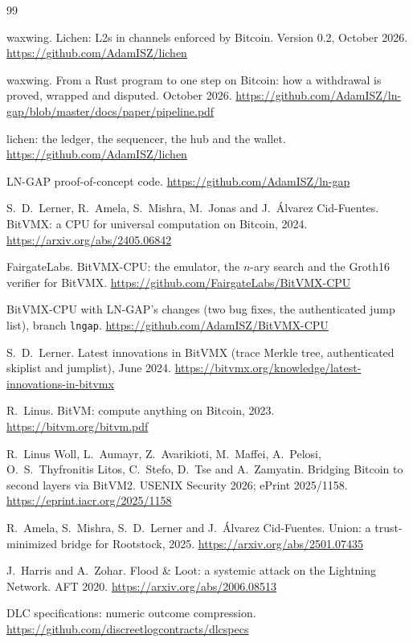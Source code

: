 \documentclass[11pt]{article}
\begin{document}
\begin{thebibliography}{99}

 waxwing. Lichen: L2s in channels enforced by Bitcoin. Version 0.2, October 2026. \url{https://github.com/AdamISZ/lichen}

 waxwing. From a Rust program to one step on Bitcoin: how a withdrawal is proved, wrapped and disputed. October 2026. \url{https://github.com/AdamISZ/ln-gap/blob/master/docs/paper/pipeline.pdf}

 lichen: the ledger, the sequencer, the hub and the wallet. \url{https://github.com/AdamISZ/lichen}

 LN-GAP proof-of-concept code. \url{https://github.com/AdamISZ/ln-gap}

 S.~D.~Lerner, R.~Amela, S.~Mishra, M.~Jonas and J.~\'Alvarez Cid-Fuentes. BitVMX: a CPU for universal computation on Bitcoin, 2024. \url{https://arxiv.org/abs/2405.06842}

 FairgateLabs. BitVMX-CPU: the emulator, the $n$-ary search and the Groth16 verifier for BitVMX. \url{https://github.com/FairgateLabs/BitVMX-CPU}

 BitVMX-CPU with LN-GAP's changes (two bug fixes, the authenticated jump list), branch \texttt{lngap}. \url{https://github.com/AdamISZ/BitVMX-CPU}

 S.~D.~Lerner. Latest innovations in BitVMX (trace Merkle tree, authenticated skiplist and jumplist), June 2024. \url{https://bitvmx.org/knowledge/latest-innovations-in-bitvmx}

 R.~Linus. BitVM: compute anything on Bitcoin, 2023. \url{https://bitvm.org/bitvm.pdf}

 R.~Linus Woll, L.~Aumayr, Z.~Avarikioti, M.~Maffei, A.~Pelosi, O.~S.~Thyfronitis Litos, C.~Stefo, D.~Tse and A.~Zamyatin. Bridging Bitcoin to second layers via BitVM2. USENIX Security 2026; ePrint 2025/1158. \url{https://eprint.iacr.org/2025/1158}

 R.~Amela, S.~Mishra, S.~D.~Lerner and J.~\'Alvarez Cid-Fuentes. Union: a trust-minimized bridge for Rootstock, 2025. \url{https://arxiv.org/abs/2501.07435}

 J.~Harris and A.~Zohar. Flood \& Loot: a systemic attack on the Lightning Network. AFT 2020. \url{https://arxiv.org/abs/2006.08513}

 DLC specifications: numeric outcome compression. \url{https://github.com/discreetlogcontracts/dlcspecs}

\end{thebibliography}
\end{document}
